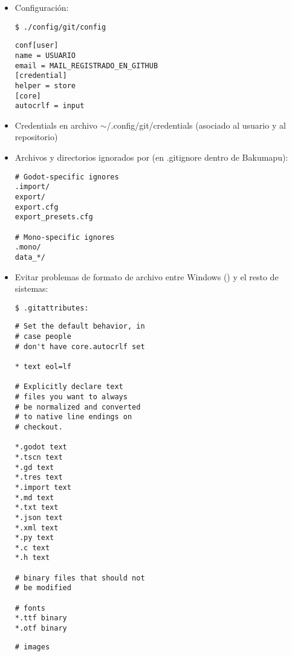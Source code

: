 \begin{itemize}[label=-]
	\item Configuración:
	\begin{lstlisting}
$ ./config/git/config
	\end{lstlisting}
	
	\begin{lstlisting}
conf[user]
name = USUARIO
email = MAIL_REGISTRADO_EN_GITHUB
[credential]
helper = store
[core]
autocrlf = input
	\end{lstlisting}
	
	\item Credentials en archivo $\sim$/.config/git/credentials (asociado al usuario y al repositorio)
	
	\item Archivos y directorios ignorados por  (en .gitignore dentro de Bakumapu):
	\begin{lstlisting}
# Godot-specific ignores
.import/
export/
export.cfg
export_presets.cfg

# Mono-specific ignores
.mono/
data_*/
	\end{lstlisting}
	
	
	\item Evitar problemas de formato de archivo entre Windows () y el resto de sistemas:
	\begin{lstlisting}
$ .gitattributes:
	\end{lstlisting}
	\noindent\begin{minipage}{.45\textwidth}
	\begin{lstlisting}
# Set the default behavior, in
# case people
# don't have core.autocrlf set

* text eol=lf

# Explicitly declare text
# files you want to always
# be normalized and converted 
# to native line endings on
# checkout.

*.godot text
*.tscn text
*.gd text
*.tres text
*.import text
*.md text
*.txt text
*.json text
*.xml text
*.py text
*.c text
*.h text

# binary files that should not
# be modified

# fonts
*.ttf binary
*.otf binary
	\end{lstlisting}
	\end{minipage}\hfill
	\begin{minipage}{.45\textwidth}
	\begin{lstlisting}[escapechar=\%]
# images


\end{lstlisting}
\end{minipage}
\end{itemize}
